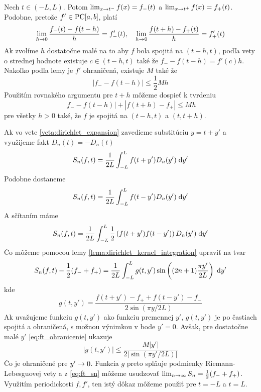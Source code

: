 \begin{dokaz}
    Nech $t \in (-L,L)$. Potom
    $\lim_{x\rightarrow t^-} f(x) = f_-(t)$ a 
    $\lim_{x\rightarrow t^+} f(x) = f_+(t)$.
    Podobne, pretože $f' \in \mbox{PC}[a,b]$, platí
    \begin{equation}
        \lim_{h\rightarrow 0} \frac{f_-(t) - f(t-h)}{h} = f'_-(t), \quad
        \lim_{h\rightarrow 0} \frac{f(t+h)-f_+(t)}{h} = f'_+(t)
    \end{equation}
    Ak zvolíme $h$ dostatočne malé na to aby $f$ bola spojitá na
    $(t-h,t)$, podľa vety o strednej hodnote
    existuje $c \in (t-h,t)$ také že 
    $f_- - f(t-h) = f'(c) h$.
    Nakoľko podľa lemy  je $f'$ ohraničená,
    existuje $M$ také že
    \begin{equation}
        |f_- - f(t-h)| \le \frac{1}{2} M h
    \end{equation}
    Použitím rovnakého argumentu pre $t+h$ môžeme dospieť k tvrdeniu
    \begin{equation}
        |f_- - f(t-h)| + |f(t+h) - f_+| \le Mh
        \label{eq:ft_ohranicenie}
    \end{equation}
    pre všetky $h>0$ také, že $f$ je spojitá na $(t-h,t)$ a $(t,t+h)$.

    Ak vo vete \ref{veta:dirichlet_expansion} zavedieme substitúciu
    $y=t+y'$ a využijeme fakt $D_n(t)=-D_n(t)$
    \begin{equation}
        S_n(f,t) = \frac{1}{2L} \int_{-L}^{L} f(t+y') D_n(y') \; \mathrm{d} y'
    \end{equation}
    Podobne dostaneme
    \begin{equation}
        S_n(f,t) = \frac{1}{2L} \int_{-L}^{L} f(t-y') D_n(y') \; \mathrm{d} y'
    \end{equation}
    A sčítaním máme
    \begin{equation}
        S_n(f,t) = \frac{1}{2L} \int_{-L}^{L} \frac{1}{2} 
            \left( f(t+y') f(t-y') \right) D_n(y') \; \mathrm{d} y'
    \end{equation}
    Čo môžeme pomocou lemy \ref{lema:dirichlet_kernel_integration}
    upraviť na tvar
    \begin{equation}
    S_n(f,t) - \frac{1}{2}(f_-+f_+)= \frac{1}{2L} \int_{-L}^{L} 
        g(t,y') \sin\left( (2n+1)\frac{\pi y'}{2L} \right)\; \mathrm{d} y'
        \label{eq:ft_sn}
    \end{equation}
    kde
    \begin{equation}
        g(t,y') = \frac{f(t+y')-f_+ + f(t-y')-f_-}{2 \sin(\pi y/ 2L)}
    \end{equation}
    Ak uvažujeme funkciu $g(t,y')$ ako funkciu premennej $y'$,
    $g(t,y')$ je po častiach spojitá a ohraničená, s možnou výnimkou
    v bode $y'=0$. Avšak, pre dostatočne malé $y'$ \ref{eq:ft_ohranicenie}
    ukazuje
    \begin{equation}
        |g(t,y')|\le \frac{M |y'|}{2|\sin(\pi y'/2L)|}
    \end{equation}
    Čo je ohraničené pre $y'\rightarrow 0$.
    Funkcia $g$ preto splňuje podmienky Riemann-Lebesguovej vety
    a z \ref{eq:ft_sn} môžeme usudzovať
    $\lim_{n\rightarrow\infty} S_n = \frac{1}{2}(f_- + f_+)$.
    Využitím periodickosti $f,f'$, ten istý dôkaz môžeme použiť pre
    $t=-L$ a $t=L$.
\end{dokaz}

